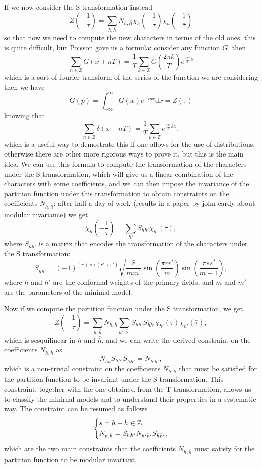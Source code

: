 If we now consider the S transformation instead
\[
    Z(-\frac{1}{\tau}) = \sum_{h, \bar{h}} N_{h,\bar{h}} \chi_h(-\frac{1}{\tau})\chi_{\bar{h}}(-\frac{1}{\bar{\tau}})
\]
so that now we need to compute the new characters in terms of the old ones. this is quite difficult, but Poisson gave us a formula: consider any function \(G\), then
\[
    \sum_{n \in \mathbb{Z}} G(x + n T) = \frac{1}{T} \sum_{k \in \mathbb{Z}} \tilde{G}(\frac{2 \pi k}{T})e^{\frac{2 \pi i}{T}k}
\]
which is a sort of fourier transform of the series of the function we are considering
then we have
\[
    \tilde{G}(p) = \int_{-\infty}^{\infty} G(x)e^{-ipx} \mathrm{d}x = Z(\tau)
\]
knowing that
\[
    \sum_{n \in \mathbb{Z}} \delta(x - nT) = \frac{1}{T} \sum_{k \in \mathbb{Z}} e^{\frac{2 \pi i}{T} k x},
\]
which is a useful way to demostrate this if one allows for the use of distributions, otherwise there are other more rigorous ways to prove it, but this is the main idea. We can use this formula to compute the transformation of the characters under the S transformation, which will give us a linear combination of the characters with some coefficients, and we can then impose the invariance of the partition function under this transformation to obtain constraints on the coefficients \(N_{h,\bar{h}}\): after half a day of work (results in a paper by john cardy about modular invariance) we get
\[
    \chi_h(-\frac{1}{\tau}) = \sum_{h'} S_{h h'} \chi_{h'}(\tau),
\]
where \(S_{h h'}\) is a matrix that encodes the transformation of the characters under the S transformation:
\[
    S_{h h^{\prime}} = (-1)^{(r+s)(r'+s')} \sqrt{\frac{8}{m m^{\prime}}} \sin \left( \frac{\pi r r'}{m} \right) \sin \left( \frac{\pi s s'}{m+1} \right),
\]
where \(h\) and \(h'\) are the conformal weights of the primary fields, and \(m\) and \(m'\) are the parameters of the minimal model.

Now if we compute the partition function under the S transformation, we get
\[
    Z(-\frac{1}{\tau}) = \sum_{h, \bar{h}} N_{h,\bar{h}} \sum_{h', \bar{h}'} S_{h h'} S_{\bar{h} \bar{h}'} \chi_{h'}(\tau) \chi_{\bar{h}'}(\bar{\tau}),
\]
which is sesquilinear in \(h\) and \(\bar{h}\), and we can write the derived constraint on the coefficients \(N_{h,\bar{h}}\) as
\[
    N_{h \bar{h}} S_{h h'} S_{\bar{h} \bar{h}'} = N_{h' \bar{h}'},
\]
which is a non-trivial constraint on the coefficients \(N_{h,\bar{h}}\) that must be satisfied for the partition function to be invariant under the S transformation. This constraint, together with the one obtained from the T transformation, allows us to classify the minimal models and to understand their properties in a systematic way. The constraint can be resumed as follows
\[
    \begin{dcases}
        s = h - \bar{h} \in \mathbb{Z}, \\
        N_{h, \bar{h}} = S_{h h'} N_{h' \bar{h}'} S_{\bar{h} \bar{h}'},
    \end{dcases}
\]
which are the two main constraints that the coefficients \(N_{h,\bar{h}}\) must satisfy for the partition function to be modular invariant.

